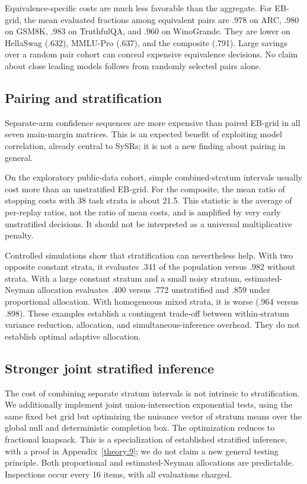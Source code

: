 Equivalence-specific costs are much less favorable than the aggregate. For EB-grid, the mean evaluated fractions among equivalent pairs are .978 on ARC, .980 on GSM8K, .983 on TruthfulQA, and .960 on WinoGrande. They are lower on HellaSwag (.632), MMLU-Pro (.637), and the composite (.791). Large savings over a random pair cohort can conceal expensive equivalence decisions. No claim about close leading models follows from randomly selected pairs alone.

\subsection{Pairing and stratification}\label{pairing-and-stratification}

Separate-arm confidence sequences are more expensive than paired EB-grid in all seven main-margin matrices. This is an expected benefit of exploiting model correlation, already central to SySRs; it is not a new finding about pairing in general.

On the exploratory public-data cohort, simple combined-stratum intervals usually cost more than an unstratified EB-grid. For the composite, the mean ratio of stopping costs with 38 task strata is about 21.5. This statistic is the average of per-replay ratios, not the ratio of mean costs, and is amplified by very early unstratified decisions. It should not be interpreted as a universal multiplicative penalty.

Controlled simulations show that stratification can nevertheless help. With two opposite constant strata, it evaluates .341 of the population versus .982 without strata. With a large constant stratum and a small noisy stratum, estimated-Neyman allocation evaluates .400 versus .772 unstratified and .859 under proportional allocation. With homogeneous mixed strata, it is worse (.964 versus .898). These examples establish a contingent trade-off between within-stratum variance reduction, allocation, and simultaneous-inference overhead. They do not establish optimal adaptive allocation.

\subsection{Stronger joint stratified inference}\label{stronger-joint-stratified-inference}

The cost of combining separate stratum intervals is not intrinsic to stratification. We additionally implement joint union-intersection exponential tests, using the same fixed bet grid but optimizing the nuisance vector of stratum means over the global null and deterministic completion box. The optimization reduces to fractional knapsack. This is a specialization of established stratified inference, with a proof in Appendix~\ref{theory:9}; we do not claim a new general testing principle. Both proportional and estimated-Neyman allocations are predictable. Inspections occur every 16 items, with all evaluations charged.

